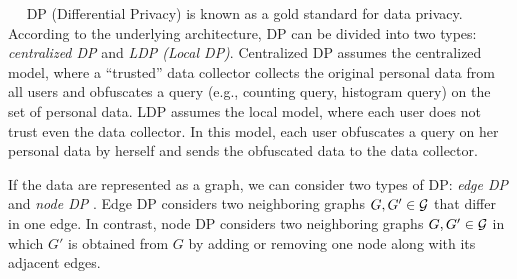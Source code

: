 \smallskip
~~
DP (Differential Privacy) \cite{DP,Dwork_ICALP06} is known as a gold standard for data privacy. 
According to the underlying architecture, DP can be divided into two 
types: 
\textit{centralized DP} and \textit{LDP (Local DP)}. 
Centralized DP assumes the centralized model, where a ``trusted'' data collector 
collects the original personal data from all users and obfuscates a query (e.g., counting query, histogram query) on the set of personal data. 
LDP assumes the local model, where each user does not trust even the data collector. 
In this model, each user obfuscates a query on her personal data by herself and sends the obfuscated data to the data collector. 

If the data are represented as a graph, we can consider two types of DP: 
\textit{edge DP} and \textit{node DP} \cite{Hay_ICDM09,Raskhodnikova_Encyclopedia16}. 
Edge DP considers two neighboring graphs $G, G' \in \mathcal{G}$ that differ in one edge. 
In contrast, node DP considers two neighboring graphs $G, G' \in \mathcal{G}$ in which $G'$ is obtained from $G$ by adding or removing one node along with its adjacent edges. 

